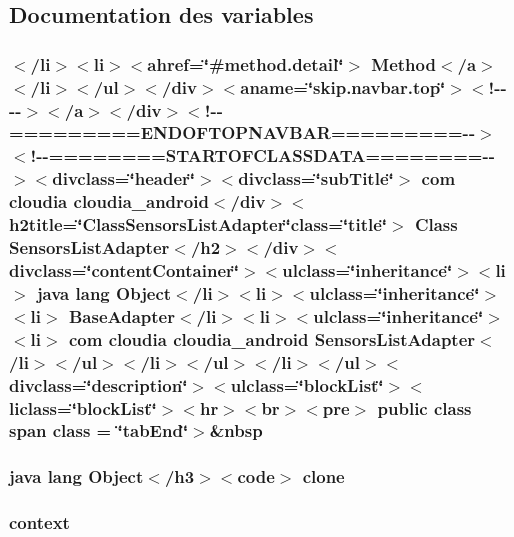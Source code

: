\subsection{Documentation des variables}
\hypertarget{_sensors_list_adapter_8html_a52ef4bd29463af801d791f2833266d34}{
\subsubsection[{class}]{\setlength{\rightskip}{0pt plus 5cm}$<$/li$>$$<$li$>$$<$ahref=\char`\"{}\#method.\-detail\char`\"{}$>$ Method$<$/{\bf a}$>$$<$/li$>$$<$/ul$>$$<$/div$>$$<$aname=\char`\"{}skip.\-navbar.\-top\char`\"{}$>$$<$!-\/-\/-\/-\/$>$$<$/a$>$$<$/div$>$$<$!-\/-\/=========E\-N\-D\-O\-F\-T\-O\-P\-N\-A\-V\-B\-A\-R=========-\/-\/$>$$<$!-\/-\/========S\-T\-A\-R\-T\-O\-F\-C\-L\-A\-S\-S\-D\-A\-T\-A========-\/-\/$>$$<$divclass=\char`\"{}header\char`\"{}$>$$<$divclass=\char`\"{}sub\-Title\char`\"{}$>$ com cloudia cloudia\-\_\-android$<$/div$>$$<$h2title=\char`\"{}Class\-Sensors\-List\-Adapter\char`\"{}class=\char`\"{}title\char`\"{}$>$ Class {\bf Sensors\-List\-Adapter}$<$/h2$>$$<$/div$>$$<$divclass=\char`\"{}content\-Container\char`\"{}$>$$<$ulclass=\char`\"{}inheritance\char`\"{}$>$$<$li$>$ java lang Object$<$/li$>$$<$li$>$$<$ulclass=\char`\"{}inheritance\char`\"{}$>$$<$li$>$ Base\-Adapter$<$/li$>$$<$li$>$$<$ulclass=\char`\"{}inheritance\char`\"{}$>$$<$li$>$ com cloudia cloudia\-\_\-android {\bf Sensors\-List\-Adapter}$<$/li$>$$<$/ul$>$$<$/li$>$$<$/ul$>$$<$/li$>$$<$/ul$>$$<$divclass=\char`\"{}description\char`\"{}$>$$<$ulclass=\char`\"{}block\-List\char`\"{}$>$$<$liclass=\char`\"{}block\-List\char`\"{}$>$$<$hr$>$$<$br$>$$<$pre$>$ public class {\bf span} class = \char`\"{}tab\-End\char`\"{}$>$\&nbsp}}\label{_sensors_list_adapter_8html_a52ef4bd29463af801d791f2833266d34}
\hypertarget{_sensors_list_adapter_8html_adc9607fcabf6f2d7f401ad52015ef6e0}{
\subsubsection[{clone}]{\setlength{\rightskip}{0pt plus 5cm}java lang Object$<$/h3$>$$<$code$>$ clone}}\label{_sensors_list_adapter_8html_adc9607fcabf6f2d7f401ad52015ef6e0}
\hypertarget{_sensors_list_adapter_8html_a261f9f58ccbeaa962c4e675e4212c9cc}{
\subsubsection[{context}]{\setlength{\rightskip}{0pt plus 5cm}context}}\label{_sensors_list_adapter_8html_a261f9f58ccbeaa962c4e675e4212c9cc}
